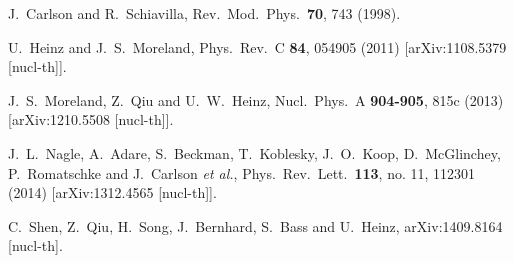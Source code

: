 \documentclass[twocolumn,showpacs,amsfonts,aps,prc,nofootinbib,floatfix]{revtex4}
\begin{document}

%
%

\begin{thebibliography}{99}
	
J.~Carlson and R.~Schiavilla,
Rev.\ Mod.\ Phys.\  {\bf 70}, 743 (1998).

U.~Heinz and J.~S.~Moreland,
Phys.\ Rev.\ C {\bf 84}, 054905 (2011)
[arXiv:1108.5379 [nucl-th]].

J.~S.~Moreland, Z.~Qiu and U.~W.~Heinz,
Nucl.\ Phys.\ A {\bf 904-905}, 815c (2013)
[arXiv:1210.5508 [nucl-th]].

J.~L.~Nagle, A.~Adare, S.~Beckman, T.~Koblesky, J.~O.~Koop, D.~McGlinchey, P.~Romatschke and J.~Carlson {\it et al.},
Phys.\ Rev.\ Lett.\  {\bf 113}, no. 11, 112301 (2014)
[arXiv:1312.4565 [nucl-th]].

C.~Shen, Z.~Qiu, H.~Song, J.~Bernhard, S.~Bass and U.~Heinz,
arXiv:1409.8164 [nucl-th].
  

\end{thebibliography}
\end{document}

